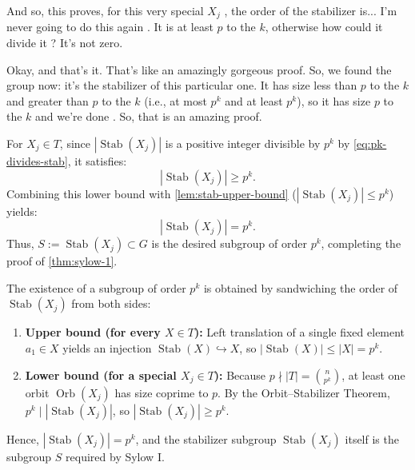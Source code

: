 \begin{proofWrapper}
\begin{speech}[00:15:50 - 00:16:33]
And so, this proves, for this very special $X_j$ , the order of the stabilizer is... I'm never going to do this again . It is at least $p$ to the $k$, otherwise how could it divide it ? It's not zero.

Okay, and that's it. That's like an amazingly gorgeous proof. So, we found the group now: it's the stabilizer of this particular one. It has size less than $p$ to the $k$ and greater than $p$ to the $k$ (i.e., at most $p^k$ and at least $p^k$), so it has size $p$ to the $k$ and we're done . So, that is an amazing proof. 
\end{speech}

\begin{content}
For $X_j \in T$, since $|\operatorname{Stab}(X_j)|$ is a positive integer divisible by $p^k$ by \eqref{eq:pk-divides-stab}, it satisfies:
\[
|\operatorname{Stab}(X_j)| \ge p^k.
\]
Combining this lower bound with \cref{lem:stab-upper-bound} ($|\operatorname{Stab}(X_j)| \le p^k$) yields:
\[
|\operatorname{Stab}(X_j)| = p^k.
\]
Thus, $S := \operatorname{Stab}(X_j) \subset G$ is the desired subgroup of order $p^k$, completing the proof of \cref{thm:sylow-1}.

\begin{steps}
The existence of a subgroup of order $p^k$ is obtained by sandwiching the order of $\operatorname{Stab}(X_j)$ from both sides:
\begin{enumerate}[label=\textbf{\arabic*.}]
    \item \textbf{Upper bound (for every $X \in T$):} Left translation of a single fixed element $a_1 \in X$ yields an injection $\operatorname{Stab}(X) \hookrightarrow X$, so $|\operatorname{Stab}(X)| \le |X| = p^k$.
    \item \textbf{Lower bound (for a special $X_j \in T$):} Because $p \nmid |T| = \binom{n}{p^k}$, at least one orbit $\operatorname{Orb}(X_j)$ has size coprime to $p$. By the Orbit--Stabilizer Theorem, $p^k \mid |\operatorname{Stab}(X_j)|$, so $|\operatorname{Stab}(X_j)| \ge p^k$.
\end{enumerate}
Hence, $|\operatorname{Stab}(X_j)| = p^k$, and the stabilizer subgroup $\operatorname{Stab}(X_j)$ itself is the subgroup $S$ required by Sylow I.
\end{steps}
\end{content}

\end{proofWrapper}

